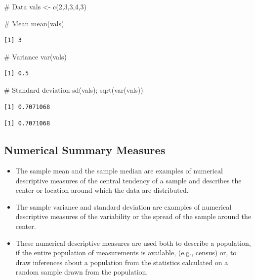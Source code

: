 \documentclass[
  letterpaper,
  DIV=11,
  numbers=noendperiod]{scrartcl}
\newenvironment{Shaded}{\begin{snugshade}}{\end{snugshade}}
\newcommand{\CommentTok}[1]{\textcolor[rgb]{0.37,0.37,0.37}{#1}}
\newcommand{\DecValTok}[1]{\textcolor[rgb]{0.68,0.00,0.00}{#1}}
\newcommand{\FunctionTok}[1]{\textcolor[rgb]{0.28,0.35,0.67}{#1}}
\newcommand{\NormalTok}[1]{\textcolor[rgb]{0.00,0.23,0.31}{#1}}
\newcommand{\OtherTok}[1]{\textcolor[rgb]{0.00,0.23,0.31}{#1}}
\begin{document}
\begin{Shaded}
\begin{Highlighting}[]
\CommentTok{\# Data}
\NormalTok{vals }\OtherTok{\textless{}{-}} \FunctionTok{c}\NormalTok{(}\DecValTok{2}\NormalTok{,}\DecValTok{3}\NormalTok{,}\DecValTok{3}\NormalTok{,}\DecValTok{4}\NormalTok{,}\DecValTok{3}\NormalTok{)}

\CommentTok{\# Mean}
\FunctionTok{mean}\NormalTok{(vals)}
\end{Highlighting}
\end{Shaded}

\begin{verbatim}
[1] 3
\end{verbatim}

\begin{Shaded}
\begin{Highlighting}[]
\CommentTok{\# Variance}
\FunctionTok{var}\NormalTok{(vals)}
\end{Highlighting}
\end{Shaded}

\begin{verbatim}
[1] 0.5
\end{verbatim}

\begin{Shaded}
\begin{Highlighting}[]
\CommentTok{\# Standard deviation}
\FunctionTok{sd}\NormalTok{(vals); }\FunctionTok{sqrt}\NormalTok{(}\FunctionTok{var}\NormalTok{(vals))}
\end{Highlighting}
\end{Shaded}

\begin{verbatim}
[1] 0.7071068
\end{verbatim}

\begin{verbatim}
[1] 0.7071068
\end{verbatim}

\subsection{Numerical Summary
Measures}\label{numerical-summary-measures}

\begin{itemize}
\item
  The sample mean and the sample median are examples of {numerical
  descriptive measures} of the {central tendency} of a sample and
  describes the center or location around which the data are
  distributed.
\item
  The sample variance and standard deviation are examples of {numerical
  descriptive measures} of the {variability} or the {spread} of the
  sample around the center.
\item
  These numerical descriptive measures are used both to describe a
  population, if the entire population of measurements is available,
  (e.g., census) or, to draw inferences about a population from the
  statistics calculated on a random sample drawn from the population.
\end{itemize}
\end{document}
